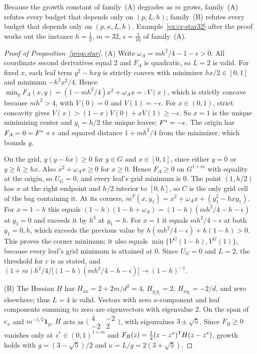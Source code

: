 Because the growth constant of family~(A) degrades as $m$ grows,
family~(A) refutes every budget that depends only on $(p,L,h)$; family~(B)
refutes every budget that depends only on $(p,\kappa,L,h)$.
Example~\ref{ex:cr-star32} after the proof works out the instance
$h=\frac12$, $m=32$, $\epsilon=\frac1{16}$ of family~(A).

\begin{proof}[Proof of Proposition~\ref{prop:star}]
(A) Write $\omega_A=mh^2/4-1-\epsilon>0$. All coordinate second derivatives
equal $2$ and $F_A$ is quadratic, so $L=2$ is valid. For fixed $x$, each leaf
term $y^2-hxy$ is strictly convex with minimizer $hx/2\in[0,1]$ and minimum
$-h^2x^2/4$. Hence $\min_yF_A(x,y)=(1-mh^2/4)x^2+\omega_Ax=:V(x)$, which is
strictly concave because $mh^2>4$, with $V(0)=0$ and $V(1)=-\epsilon$. For
$x\in(0,1)$, strict concavity gives $V(x)>(1-x)V(0)+xV(1)\ge-\epsilon$. So
$x=1$ is the unique minimizing center and $y_i=h/2$ the unique leaves;
$F^{*}=-\epsilon$. The origin has $F_A=0=F^{*}+\epsilon$ and squared distance
$1+mh^2/4$ from the minimizer, which bounds $g$.

On the grid, $y(y-hx)\ge0$ for $y\in G$ and $x\in[0,1]$, since either $y=0$
or $y\ge h\ge hx$. Also $x^2+\omega_Ax\ge0$ for $x\ge0$. Hence $F_A\ge0$ on
$G^{1+m}$ with equality at the origin, so $U_G=0$, and every leaf's grid
minimum is $0$. The point $(1,h/2)$ has $x$ at the right endpoint and $h/2$
interior to $[0,h]$, so $C$ is the only grid cell of the bag containing it.
At its corners, $m^F(x,y_1)=x^2+\omega_Ax+(y_1^2-hxy_1)$. For $x=1-h$ this
equals $(1-h)(1-h+\omega_A)=(1-h)(mh^2/4-h-\epsilon)$ at $y_1=0$ and exceeds
it by $h^3$ at $y_1=h$. For $x=1$ it equals $mh^2/4-\epsilon$ at both
$y_1=0,h$, which exceeds the previous value by
$h(mh^2/4-\epsilon)+h(1-h)>0$. This proves the corner minimum; it also equals
$\min\{V^G(1-h),V^G(1)\}$, because every leaf's grid minimum is attained at
$0$. Since $U_G=0$ and $L=2$, the threshold for $c$ is as stated, and
$(1+m)h^2/4\big/\bigl[(1-h)(mh^2/4-h-\epsilon)\bigr]\to(1-h)^{-1}$.

(B) The Hessian $H$ has $H_{xx}=2+2m/d^2=4$, $H_{y_iy_i}=2$,
$H_{xy_i}=-2/d$, and zero elsewhere; thus $L=4$ is valid. Vectors with zero
$x$-component and leaf components summing to zero are eigenvectors with
eigenvalue $2$. On the span of $e_x$ and $m^{-1/2}\mathbf 1_y$, $H$ acts as
$\bigl(\begin{smallmatrix}4&-2\\-2&2\end{smallmatrix}\bigr)$, with
eigenvalues $3\pm\sqrt5$. Since $F_B\ge0$ vanishes only at
$z^*\in(0,1)^{1+m}$ and $F_B(z)=\frac12(z-z^*)^{\mathsf T}H(z-z^*)$, growth holds
with $g=(3-\sqrt5)/2$ and $\kappa=L/g=2(3+\sqrt5)$.


\end{proof}
